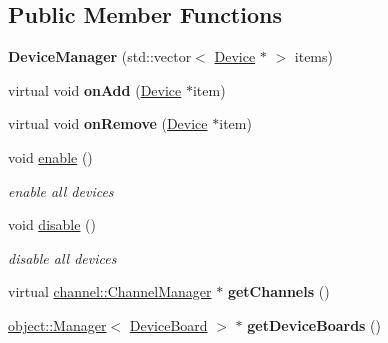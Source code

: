 \subsection*{Public Member Functions}
\begin{DoxyCompactItemize}
\item 
\hypertarget{classdrobot_1_1device_1_1DeviceManager_aba9dc9fb30c827f0ec4bef28da30a831}{{\bfseries Device\-Manager} (std\-::vector$<$ \hyperlink{classdrobot_1_1device_1_1Device}{Device} $\ast$ $>$ items)}\label{classdrobot_1_1device_1_1DeviceManager_aba9dc9fb30c827f0ec4bef28da30a831}

\item 
\hypertarget{classdrobot_1_1device_1_1DeviceManager_a798b2afae1722099f3871e291f825ab7}{virtual void {\bfseries on\-Add} (\hyperlink{classdrobot_1_1device_1_1Device}{Device} $\ast$item)}\label{classdrobot_1_1device_1_1DeviceManager_a798b2afae1722099f3871e291f825ab7}

\item 
\hypertarget{classdrobot_1_1device_1_1DeviceManager_a76832451e5b3bd1809ae6f3af9742c85}{virtual void {\bfseries on\-Remove} (\hyperlink{classdrobot_1_1device_1_1Device}{Device} $\ast$item)}\label{classdrobot_1_1device_1_1DeviceManager_a76832451e5b3bd1809ae6f3af9742c85}

\item 
\hypertarget{classdrobot_1_1device_1_1DeviceManager_a17b122c34ca4c3da6b98d088ea39067e}{void \hyperlink{classdrobot_1_1device_1_1DeviceManager_a17b122c34ca4c3da6b98d088ea39067e}{enable} ()}\label{classdrobot_1_1device_1_1DeviceManager_a17b122c34ca4c3da6b98d088ea39067e}

\begin{DoxyCompactList}\small\item\em enable all devices \end{DoxyCompactList}\item 
\hypertarget{classdrobot_1_1device_1_1DeviceManager_a8680286a13e0f605acf0c23880e5f41d}{void \hyperlink{classdrobot_1_1device_1_1DeviceManager_a8680286a13e0f605acf0c23880e5f41d}{disable} ()}\label{classdrobot_1_1device_1_1DeviceManager_a8680286a13e0f605acf0c23880e5f41d}

\begin{DoxyCompactList}\small\item\em disable all devices \end{DoxyCompactList}\item 
\hypertarget{classdrobot_1_1device_1_1DeviceManager_a2c3e9fba1d847e7a9e0361c4e8c8cd9c}{virtual \hyperlink{classdrobot_1_1device_1_1channel_1_1ChannelManager}{channel\-::\-Channel\-Manager} $\ast$ {\bfseries get\-Channels} ()}\label{classdrobot_1_1device_1_1DeviceManager_a2c3e9fba1d847e7a9e0361c4e8c8cd9c}

\item 
\hypertarget{classdrobot_1_1device_1_1DeviceManager_ab66e717072a3a659031c549093539662}{\hyperlink{classdrobot_1_1object_1_1Manager}{object\-::\-Manager}$<$ \hyperlink{classdrobot_1_1device_1_1DeviceBoard}{Device\-Board} $>$ $\ast$ {\bfseries get\-Device\-Boards} ()}\label{classdrobot_1_1device_1_1DeviceManager_ab66e717072a3a659031c549093539662}

\end{DoxyCompactItemize}
